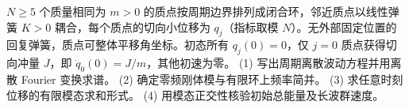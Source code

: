 \(N\ge5\) 个质量相同为 \(m>0\) 的质点按周期边界排列成闭合环，邻近质点以线性弹簧 \(K>0\) 耦合，每个质点的切向小位移为 \(q_j\)（指标取模 \(N\)）。无外部固定位置的回复弹簧，质点可整体平移角坐标。初态所有 \(q_j(0)=0\)，仅 \(j=0\) 质点获得切向冲量 \(J\)，即 \(\dot q_0(0)=J/m\)，其他初速为零。
(1) 写出周期离散波动方程并用离散 Fourier 变换求谱。
(2) 确定零频刚体模与有限环上频率简并。
(3) 求任意时刻位移的有限模态求和形式。
(4) 用模态正交性核验初始总能量及长波群速度。
